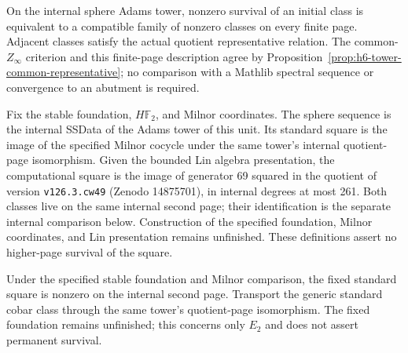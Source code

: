 \begin{definition}
  \label{def:h6-pagewise-permanence}
  \leanok
  On the internal sphere Adams tower, nonzero survival of an initial class
  is equivalent to a compatible family of nonzero classes on every finite
  page. Adjacent classes satisfy the actual quotient representative relation.
  The common-$Z_\infty$ criterion and this finite-page description agree
  by Proposition~\ref{prop:h6-tower-common-representative}; no comparison
  with a Mathlib spectral sequence or convergence to an abutment is required.
\end{definition}



\begin{definition}
  \label{def:h6-fixed-computation}
  \notready
  Fix the stable foundation, $H\mathbb F_2$, and Milnor coordinates.
  The sphere sequence is the internal SSData of the Adams tower of this unit.
  Its standard square is the image of the specified Milnor cocycle under
  the same tower's internal quotient-page isomorphism. Given the bounded
  Lin algebra presentation, the computational square is the image of
  generator 69 squared in the quotient of version \texttt{v126.3.cw49}
  (Zenodo 14875701), in internal degrees at most 261.
  Both classes live on the same internal second page; their identification
  is the separate internal comparison below. Construction of the specified
  foundation, Milnor coordinates, and Lin presentation remains unfinished.
  These definitions assert no higher-page survival of the square.
\end{definition}

\begin{proposition}
  \label{prop:h6-fixed-standard-square-nonzero}
  \notready
  Under the specified stable foundation and Milnor comparison, the fixed
  standard square is nonzero on the internal second page. Transport the
  generic standard cobar class through the same tower's quotient-page
  isomorphism. The fixed foundation remains unfinished; this concerns only
  $E_2$ and does not assert permanent survival.
\end{proposition}

